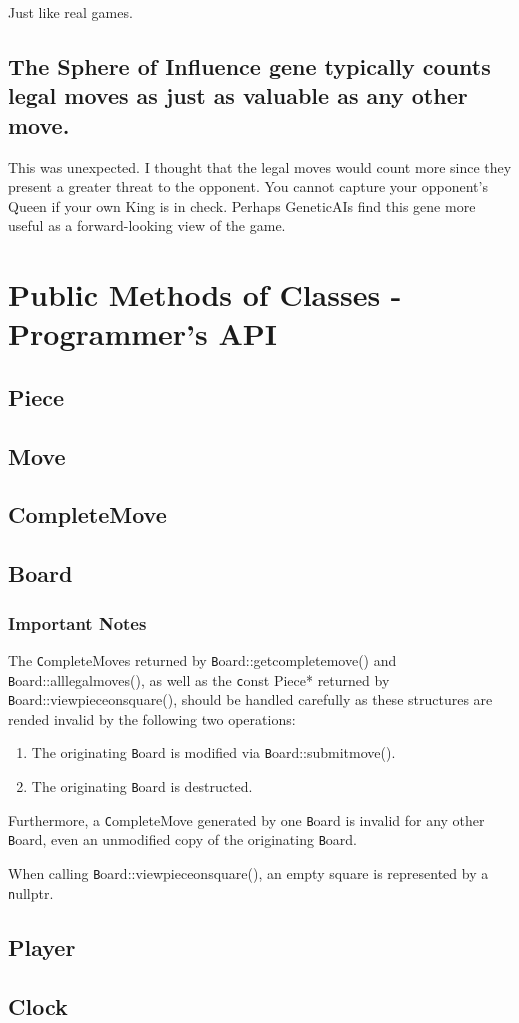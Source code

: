 \documentclass[letter]{article}
\newcommand{\code}[1]{{\texttt #1}}
\renewcommand\_{\textunderscore\allowbreak}
\begin{document}
Just like real games.


\subsection*{The Sphere of Influence gene typically counts legal moves as just as valuable as any other move.}

This was unexpected. I thought that the legal moves would count more since they present a greater threat to the opponent. You cannot capture your opponent's Queen if your own King is in check. Perhaps Genetic\_AIs find this gene more useful as a forward-looking view of the game.


\section{Public Methods of Classes - Programmer's API}

\subsection{Piece}

\subsection{Move}

\subsection{Complete\_Move}

\subsection{Board}
\subsubsection{Important Notes}
The \code{Complete\_Move}s returned by \code{Board::get\_complete\_move()} and \code{Board::all\_legal\_moves()}, as well as the \code{const Piece*} returned by \code{Board::view\_piece\_on\_square()}, should be handled carefully as these structures are rended invalid by the following two operations:
\begin{enumerate}
	\item The originating \code{Board} is modified via \code{Board::submit\_move()}.
	\item The originating \code{Board} is destructed.
\end{enumerate}
Furthermore, a \code{Complete\_Move} generated by one \code{Board} is invalid for any other \code{Board}, even an unmodified copy of the originating \code{Board}.

When calling \code{Board::view\_piece\_on\_square()}, an empty square is represented by a \code{nullptr}.

\subsection{Player}

\subsection{Clock}
\end{document}
